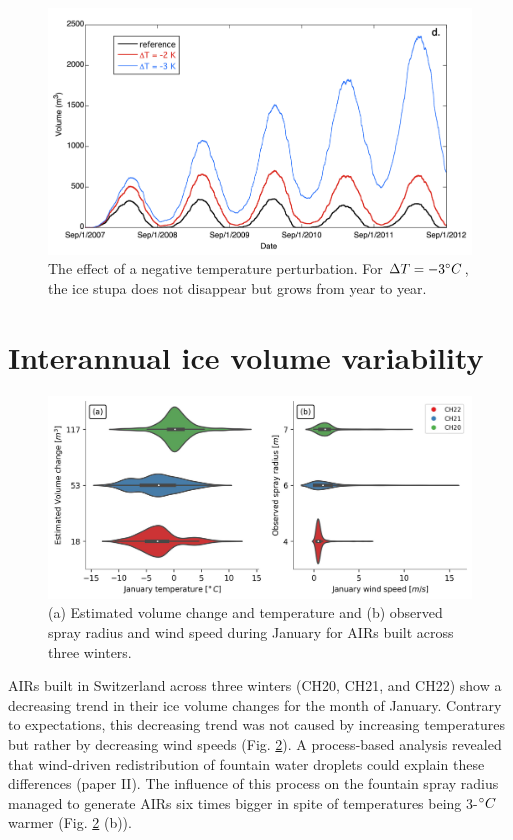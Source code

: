 \begin{figure}
	\centering
	\includegraphics[width=\textwidth]{figs/PIR_evolution.png}
	\caption{The effect of a negative temperature perturbation. For $\Delta T = -3 ^{\circ} C$, the ice stupa does
		not disappear but grows from year to year.}
	\label{fig:PIR_evolution}
\end{figure}


\section{Interannual ice volume variability}
\label{sec:interannual}

\begin{figure}
	\centering
	\includegraphics[width=\textwidth]{figs/CH_diffs.jpg}
	\caption{(a) Estimated volume change and temperature and (b) observed spray radius and wind speed
		during January for \ac{AIRs} built across three winters. }
	\label{fig:CH_diffs}
\end{figure}

\ac{AIRs} built in Switzerland across three winters (CH20, CH21, and CH22) show a decreasing trend in their ice volume
changes for the month of January. Contrary to expectations, this decreasing trend was not caused by increasing
temperatures but rather by decreasing wind speeds (Fig. \ref{fig:CH_diffs}). A process-based analysis revealed
that wind-driven redistribution of fountain water droplets could explain these differences (paper II). The influence of this process on
the fountain spray radius managed to generate \ac{AIRs} six times bigger in spite of temperatures being 3-$^{\circ} C$
warmer (Fig. \ref{fig:CH_diffs} (b)).



